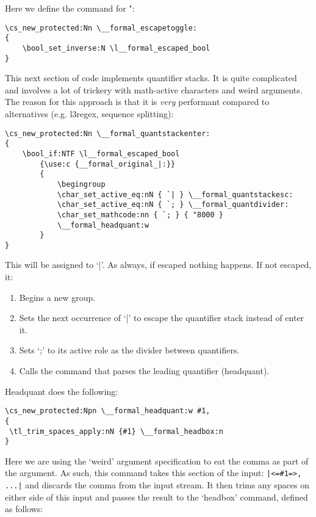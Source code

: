\documentclass{article}
\begin{document}
\noindent Here we define the command for ":
\begin{Verbatim}
\cs_new_protected:Nn \__formal_escapetoggle:
{
    \bool_set_inverse:N \l__formal_escaped_bool
}
\end{Verbatim}

This next section of code implements quantifier stacks. It is quite complicated and involves a lot of trickery with math-active characters and weird arguments. The reason for this approach is that it is \emph{very} performant compared to alternatives (e.g. l3regex, sequence splitting):
\begin{Verbatim}
\cs_new_protected:Nn \__formal_quantstackenter:
{
    \bool_if:NTF \l__formal_escaped_bool 
        {\use:c {__formal_original_|:}}
        {
            \begingroup
            \char_set_active_eq:nN { `| } \__formal_quantstackesc:
            \char_set_active_eq:nN { `; } \__formal_quantdivider:
            \char_set_mathcode:nn { `; } { "8000 }
            \__formal_headquant:w
        }
}
\end{Verbatim}
This will be assigned to `|'. As always, if escaped nothing happens. If not escaped, it:
\begin{enumerate}
    \item Begins a new group.
    \item Sets the next occurrence of `|' to escape the quantifier stack instead of enter it.
    \item Sets `;' to its active role as the divider between quantifiers.
    \item Calls the command that parses the leading quantifier (headquant).
\end{enumerate}
Headquant does the following:
\begin{Verbatim}
\cs_new_protected:Npn \__formal_headquant:w #1,
{                             
 \tl_trim_spaces_apply:nN {#1} \__formal_headbox:n
}
\end{Verbatim}
Here we are using the `weird' argument specification to eat the comma as part of the argument. As such, this command takes this section of the input: \texttt{|<=\#1=>, ...|} and discards the comma from the input stream. It then trims any spaces on either side of this input and passes the result to the `headbox' command, defined as follows:
\end{document}
